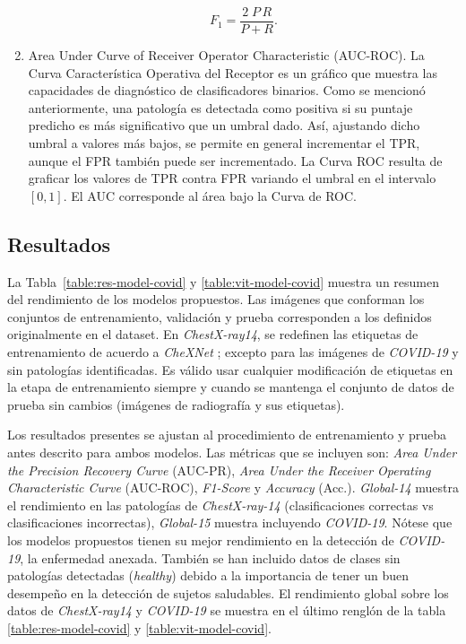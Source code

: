 \begin{enumerate}
    \begin{equation}
        \label{eq:f1}
        F_1 = \frac{2\; P \, R}{P + R}.
    \end{equation}

    \item  Area Under Curve of Receiver Operator Characteristic (AUC-ROC). La Curva Característica
        Operativa del Receptor es un gráfico que muestra las capacidades de diagnóstico de clasificadores
        binarios. Como se mencionó anteriormente, una patología es detectada como positiva si su puntaje
        predicho es más significativo que un umbral dado. Así, ajustando dicho umbral a valores más bajos,
        se permite en general incrementar el TPR, aunque el FPR también puede ser incrementado. La Curva ROC
        resulta de graficar los valores de TPR contra FPR variando el umbral en el intervalo $[0,1]$. El AUC
        corresponde al área bajo la Curva de ROC.


\end{enumerate}


\subsection{Resultados}

La Tabla~\ref{table:res-model-covid} y \ref{table:vit-model-covid} muestra un resumen del rendimiento
de los modelos propuestos. Las imágenes que conforman los conjuntos de entrenamiento, validación y prueba
corresponden a los definidos originalmente en el dataset. En \textit{ChestX-ray14}, se redefinen las etiquetas
de entrenamiento de acuerdo a \textit{CheXNet} \cite{rajpurkar2018deep}; excepto para las imágenes de
\textit{COVID-19} y sin patologías identificadas. Es válido usar cualquier modificación de etiquetas en la
etapa de entrenamiento siempre y cuando se mantenga el conjunto de datos de prueba sin cambios (imágenes de
radiografía y sus etiquetas).

Los resultados presentes se ajustan al procedimiento de entrenamiento y prueba antes descrito para ambos
modelos. Las métricas que se incluyen son: \textit{Area Under the Precision Recovery Curve} (AUC-PR),
\textit{Area Under the Receiver Operating Characteristic Curve} (AUC-ROC), \textit{F1-Score} y
\textit{Accuracy} (Acc.). \textit{Global-14} muestra el rendimiento en las patologías de \textit{ChestX-ray-14}
(clasificaciones correctas vs clasificaciones incorrectas), \textit{Global-15} muestra incluyendo
\textit{COVID-19}. Nótese que los modelos propuestos tienen su mejor rendimiento en la detección de
\textit{COVID-19}, la enfermedad anexada. También se han incluido datos de clases sin patologías detectadas
(\textit{healthy}) debido a la importancia de tener un buen desempeño en la detección de sujetos saludables.
El rendimiento global sobre los datos de \textit{ChestX-ray14} y \textit{COVID-19} se muestra en el último
renglón de la tabla \ref{table:res-model-covid} y \ref{table:vit-model-covid}.


